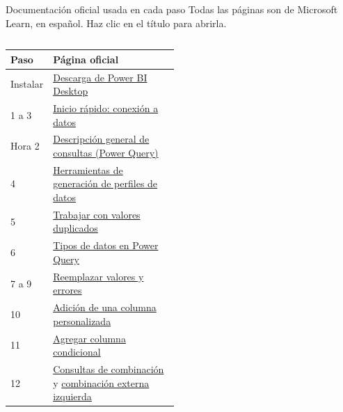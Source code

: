 \documentclass[aspectratio=169,11pt]{beamer}
\newcommand{\urlconsultas}{https://learn.microsoft.com/es-es/power-bi/transform-model/desktop-query-overview}
\newcommand{\urlconectar}{https://learn.microsoft.com/es-es/power-bi/connect-data/desktop-quickstart-connect-to-data}
\newcommand{\urlinstalar}{https://learn.microsoft.com/es-es/power-bi/fundamentals/desktop-get-the-desktop}
\begin{document}
\begin{frame}[t]{Documentación oficial usada en cada paso}
  \scriptsize
  Todas las páginas son de Microsoft Learn, en español. Haz clic en el
  título para abrirla.
  \vspace{0.1cm}
  \renewcommand{\arraystretch}{1.08}
  \begin{columns}[T,onlytextwidth]
    \begin{tabular}{@{}L{1.4cm}L{4.95cm}@{}}
      \toprule
      \textbf{Paso} & \textbf{Página oficial} \\
      \midrule
      Instalar & \href{\urlinstalar}{\color{esumerOrange}Descarga de Power BI Desktop} \\
      1 a 3 & \href{\urlconectar}{\color{esumerOrange}Inicio rápido: conexión a datos} \\
      Hora 2 & \href{\urlconsultas}{\color{esumerOrange}Descripción general de consultas (Power Query)} \\
      4 & \href{https://learn.microsoft.com/es-es/power-query/data-profiling-tools}{\color{esumerOrange}Herramientas de generación de perfiles de datos} \\
      5 & \href{https://learn.microsoft.com/es-es/power-query/working-with-duplicates}{\color{esumerOrange}Trabajar con valores duplicados} \\
      6 & \href{https://learn.microsoft.com/es-es/power-query/data-types}{\color{esumerOrange}Tipos de datos en Power Query} \\
      7 a 9 & \href{https://learn.microsoft.com/es-es/power-query/replace-values}{\color{esumerOrange}Reemplazar valores y errores} \\
      10 & \href{https://learn.microsoft.com/es-es/power-query/add-custom-column}{\color{esumerOrange}Adición de una columna personalizada} \\
      11 & \href{https://learn.microsoft.com/es-es/power-query/add-conditional-column}{\color{esumerOrange}Agregar columna condicional} \\
      12 & \href{https://learn.microsoft.com/es-es/power-query/merge-queries-overview}{\color{esumerOrange}Consultas de combinación} y \href{https://learn.microsoft.com/es-es/power-query/merge-queries-left-outer}{\color{esumerOrange}combinación externa izquierda} \\
      \bottomrule
    \end{tabular}
    \begin{tabular}{@{}L{1.4cm}L{4.95cm}@{}}
      \toprule

\end{tabular}
\end{columns}
\end{frame}
\end{document}
